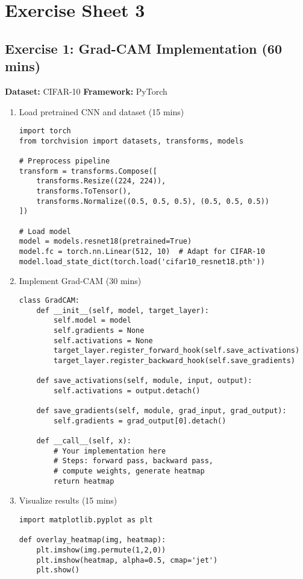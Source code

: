 \chapter*{Exercise Sheet 3}
\section*{Exercise 1: Grad-CAM Implementation (60 mins)}
\textbf{Dataset:} CIFAR-10 \quad \textbf{Framework:} PyTorch

\begin{enumerate}
\item Load pretrained CNN and dataset (15 mins)
\begin{verbatim}
import torch
from torchvision import datasets, transforms, models

# Preprocess pipeline
transform = transforms.Compose([
    transforms.Resize((224, 224)),
    transforms.ToTensor(),
    transforms.Normalize((0.5, 0.5, 0.5), (0.5, 0.5, 0.5))
])

# Load model
model = models.resnet18(pretrained=True)
model.fc = torch.nn.Linear(512, 10)  # Adapt for CIFAR-10
model.load_state_dict(torch.load('cifar10_resnet18.pth'))
\end{verbatim}

\item Implement Grad-CAM (30 mins)
\begin{verbatim}
class GradCAM:
    def __init__(self, model, target_layer):
        self.model = model
        self.gradients = None
        self.activations = None
        target_layer.register_forward_hook(self.save_activations)
        target_layer.register_backward_hook(self.save_gradients)
    
    def save_activations(self, module, input, output):
        self.activations = output.detach()
    
    def save_gradients(self, module, grad_input, grad_output):
        self.gradients = grad_output[0].detach()
    
    def __call__(self, x):
        # Your implementation here
        # Steps: forward pass, backward pass, 
        # compute weights, generate heatmap
        return heatmap
\end{verbatim}

\item Visualize results (15 mins)
\begin{verbatim}
import matplotlib.pyplot as plt

def overlay_heatmap(img, heatmap):
    plt.imshow(img.permute(1,2,0))
    plt.imshow(heatmap, alpha=0.5, cmap='jet')
    plt.show()
\end{verbatim}
\end{enumerate}

